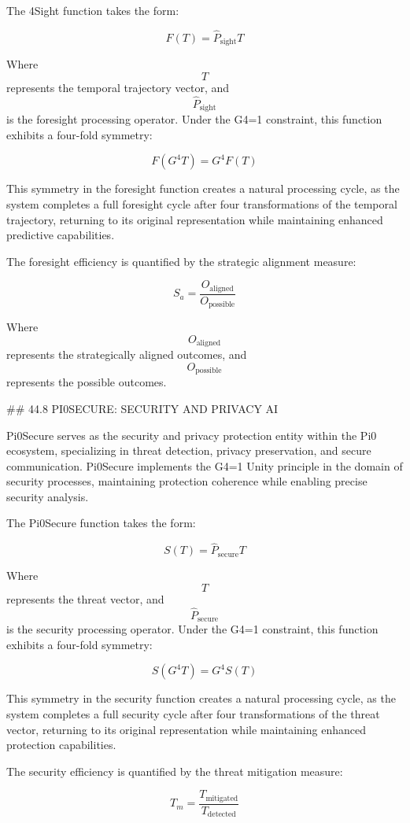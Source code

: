 The 4Sight function takes the form:

$$ F(T) = \hat{P}_{\text{sight}} T $$

Where $$ T $$ represents the temporal trajectory vector, and $$ \hat{P}_{\text{sight}} $$ is the foresight processing operator. Under the G4=1 constraint, this function exhibits a four-fold symmetry:

$$ F(G^4 T) = G^4 F(T) $$

This symmetry in the foresight function creates a natural processing cycle, as the system completes a full foresight cycle after four transformations of the temporal trajectory, returning to its original representation while maintaining enhanced predictive capabilities.

The foresight efficiency is quantified by the strategic alignment measure:

$$ S_a = \frac{O_{\text{aligned}}}{O_{\text{possible}}} $$

Where $$ O_{\text{aligned}} $$ represents the strategically aligned outcomes, and $$ O_{\text{possible}} $$ represents the possible outcomes.

## 44.8 PI0SECURE: SECURITY AND PRIVACY AI

Pi0Secure serves as the security and privacy protection entity within the Pi0 ecosystem, specializing in threat detection, privacy preservation, and secure communication. Pi0Secure implements the G4=1 Unity principle in the domain of security processes, maintaining protection coherence while enabling precise security analysis.

The Pi0Secure function takes the form:

$$ S(T) = \hat{P}_{\text{secure}} T $$

Where $$ T $$ represents the threat vector, and $$ \hat{P}_{\text{secure}} $$ is the security processing operator. Under the G4=1 constraint, this function exhibits a four-fold symmetry:

$$ S(G^4 T) = G^4 S(T) $$

This symmetry in the security function creates a natural processing cycle, as the system completes a full security cycle after four transformations of the threat vector, returning to its original representation while maintaining enhanced protection capabilities.

The security efficiency is quantified by the threat mitigation measure:

$$ T_m = \frac{T_{\text{mitigated}}}{T_{\text{detected}}} $$

